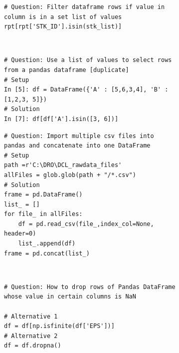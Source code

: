 

	

\begin{figure}[tbh]
\label{fig:daatset-cases}
\caption{Examples of \stackoverflow code }
\begin{subfigure}{0.5\textwidth}
\begin{lstlisting}[title={Case 1. Single line code snippet.}, label={lst:case1}, captionpos = b]
# Question: Filter dataframe rows if value in column is in a set list of values
rpt[rpt['STK_ID'].isin(stk_list)]
\end{lstlisting}
\end{subfigure}
~
\begin{subfigure}{0.5\textwidth}
\begin{lstlisting}[title={Case 2. Single line solution code.}, label={lst:case2}, captionpos = b]
# Question: Use a list of values to select rows from a pandas dataframe [duplicate]
# Setup
In [5]: df = DataFrame({'A' : [5,6,3,4], 'B' : [1,2,3, 5]})
# Solution
In [7]: df[df['A'].isin([3, 6])]
\end{lstlisting}
\end{subfigure}  

\begin{subfigure}{0.5\textwidth}
\begin{lstlisting}[title={Case 3. Multi-line solution code}, label={lst:case3}, captionpos = b]
# Question: Import multiple csv files into pandas and concatenate into one DataFrame 
# Setup
path =r'C:\DRO\DCL_rawdata_files' 
allFiles = glob.glob(path + "/*.csv")
# Solution
frame = pd.DataFrame()
list_ = []
for file_ in allFiles:
    df = pd.read_csv(file_,index_col=None, header=0)
    list_.append(df)
frame = pd.concat(list_)
\end{lstlisting}
\end{subfigure}
~
\begin{subfigure}{0.5\textwidth}
\begin{lstlisting}[title={Case 4. Multiple solutions in the snippet (13413590)}, label={lst:case4}, captionpos = b]
# Question: How to drop rows of Pandas DataFrame whose value in certain columns is NaN 

# Alternative 1
df = df[np.isfinite(df['EPS'])]
# Alternative 2
df = df.dropna()
\end{lstlisting}
\end{subfigure}

\end{figure}


